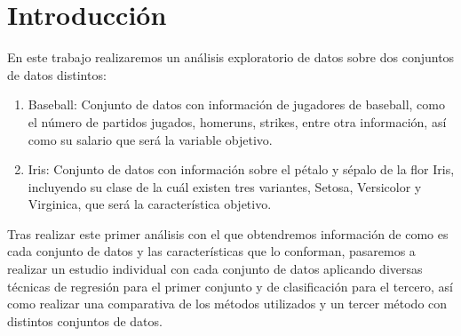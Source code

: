 \section{Introducción}

En este trabajo realizaremos un análisis exploratorio de datos sobre dos conjuntos de datos distintos:

\begin{enumerate}
	\item Baseball: Conjunto de datos con información de jugadores de baseball, como el número de partidos jugados, homeruns, strikes, entre otra información, así como su salario que será la variable objetivo.
	\item Iris: Conjunto de datos con información sobre el pétalo y sépalo de la flor Iris, incluyendo su clase de la cuál existen tres variantes, Setosa, Versicolor y Virginica, que será la característica objetivo.
\end{enumerate}

Tras realizar este primer análisis con el que obtendremos información de como es cada conjunto de datos y las características que lo conforman, pasaremos a realizar un estudio individual con cada conjunto de datos aplicando diversas técnicas de regresión para el primer conjunto y de clasificación para el tercero, así como realizar una comparativa de los métodos utilizados y un tercer método con distintos conjuntos de datos.
